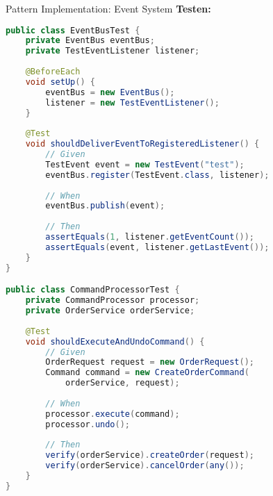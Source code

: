 \begin{example2}[breakable]{Pattern Implementation: Event System}
\textbf{Testen:}
\begin{lstlisting}[language=Java, style=basesmol]
public class EventBusTest {
    private EventBus eventBus;
    private TestEventListener listener;
    
    @BeforeEach
    void setUp() {
        eventBus = new EventBus();
        listener = new TestEventListener();
    }
    
    @Test
    void shouldDeliverEventToRegisteredListener() {
        // Given
        TestEvent event = new TestEvent("test");
        eventBus.register(TestEvent.class, listener);
        
        // When
        eventBus.publish(event);
        
        // Then
        assertEquals(1, listener.getEventCount());
        assertEquals(event, listener.getLastEvent());
    }
}

public class CommandProcessorTest {
    private CommandProcessor processor;
    private OrderService orderService;
    
    @Test
    void shouldExecuteAndUndoCommand() {
        // Given
        OrderRequest request = new OrderRequest();
        Command command = new CreateOrderCommand(
            orderService, request);
            
        // When
        processor.execute(command);
        processor.undo();
        
        // Then
        verify(orderService).createOrder(request);
        verify(orderService).cancelOrder(any());
    }
}
\end{lstlisting}
\end{example2}

